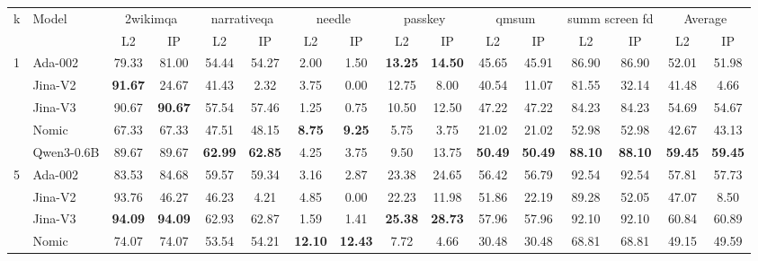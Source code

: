 \begin{sidewaystable}[htbp!]
\centering
\footnotesize
{}
\label{tab:detailed_nDCG}
\begin{tabular}{llcccccccccccccc}
\toprule
\multirow{2}{*}{k} & \multirow{2}{*}{Model} & \multicolumn{2}{c}{2wikimqa} & \multicolumn{2}{c}{narrativeqa} & \multicolumn{2}{c}{needle} & \multicolumn{2}{c}{passkey} & \multicolumn{2}{c}{qmsum} & \multicolumn{2}{c}{summ screen fd} & \multicolumn{2}{c}{Average} \\
\cmidrule(lr){3-4} \cmidrule(lr){5-6} \cmidrule(lr){7-8} \cmidrule(lr){9-10} \cmidrule(lr){11-12} \cmidrule(lr){13-14} \cmidrule(lr){15-16}
& & L2 & IP & L2 & IP & L2 & IP & L2 & IP & L2 & IP & L2 & IP & L2 & IP \\
\midrule
\multirow{5}{*}{1} & Ada-002 & 79.33 & 81.00 & 54.44 & 54.27 & 2.00 & 1.50 & \textbf{13.25} & \textbf{14.50} & 45.65 & 45.91 & 86.90 & 86.90 & 52.01 & 51.98 \\
& Jina-V2 & \textbf{91.67} & 24.67 & 41.43 & 2.32 & 3.75 & 0.00 & 12.75 & 8.00 & 40.54 & 11.07 & 81.55 & 32.14 & 41.48 & 4.66 \\
& Jina-V3 & 90.67 & \textbf{90.67} & 57.54 & 57.46 & 1.25 & 0.75 & 10.50 & 12.50 & 47.22 & 47.22 & 84.23 & 84.23 & 54.69 & 54.67 \\
& Nomic & 67.33 & 67.33 & 47.51 & 48.15 & \textbf{8.75} & \textbf{9.25} & 5.75 & 3.75 & 21.02 & 21.02 & 52.98 & 52.98 & 42.67 & 43.13 \\
& Qwen3-0.6B & 89.67 & 89.67 & \textbf{62.99} & \textbf{62.85} & 4.25 & 3.75 & 9.50 & 13.75 & \textbf{50.49} & \textbf{50.49} & \textbf{88.10} & \textbf{88.10} & \textbf{59.45} & \textbf{59.45} \\
\midrule
\multirow{5}{*}{5} & Ada-002 & 83.53 & 84.68 & 59.57 & 59.34 & 3.16 & 2.87 & 23.38 & 24.65 & 56.42 & 56.79 & 92.54 & 92.54 & 57.81 & 57.73 \\
& Jina-V2 & 93.76 & 46.27 & 46.23 & 4.21 & 4.85 & 0.00 & 22.23 & 11.98 & 51.86 & 22.19 & 89.28 & 52.05 & 47.07 & 8.50 \\
& Jina-V3 & \textbf{94.09} & \textbf{94.09} & 62.93 & 62.87 & 1.59 & 1.41 & \textbf{25.38} & \textbf{28.73} & 57.96 & 57.96 & 92.10 & 92.10 & 60.84 & 60.89 \\
& Nomic & 74.07 & 74.07 & 53.54 & 54.21 & \textbf{12.10} & \textbf{12.43} & 7.72 & 4.66 & 30.48 & 30.48 & 68.81 & 68.81 & 49.15 & 49.59 \\

\end{tabular}
\end{sidewaystable}
